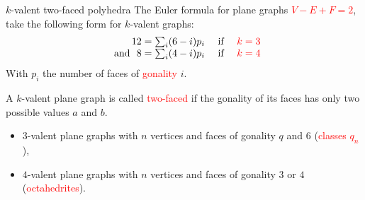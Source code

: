 \documentclass[%
pdf,
colorBG,
slideColor,
]{prosper}
\begin{document}
\begin{slide}{$k$-valent two-faced polyhedra}
The Euler formula for plane graphs \textcolor{red}{$V-E+F=2$},\\
take the following form for $k$-valent graphs:
\begin{equation*}
\begin{array}{rcl}
12=\sum_{i} (6-i) p_i&\mbox{~if~}&\textcolor{red}{k=3}\\
\mbox{~~and~~}8=\sum_{i} (4-i) p_i&\mbox{~if~}&\textcolor{red}{k=4}
\end{array}
\end{equation*}
With $p_i$ the number of faces of \textcolor{red}{gonality} $i$.

A $k$-valent plane graph is called \textcolor{red}{two-faced} if the gonality of its faces has only two possible values $a$ and $b$.

\begin{itemize}
\item $3$-valent plane graphs with $n$ vertices and faces of gonality $q$ and $6$ (\textcolor{red}{classes $q_n$}),
\item $4$-valent plane graphs with $n$ vertices and faces of gonality $3$ or $4$ (\textcolor{red}{octahedrites}).
\end{itemize}

\end{slide}
\end{document}
